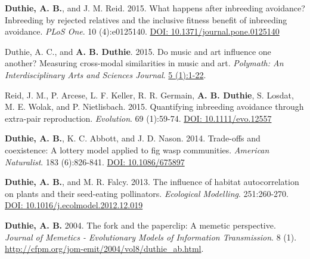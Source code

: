\documentclass[letterpaper]{article}
\begin{document}
\begin{etaremune}
\item {\bf Duthie, A. B.}, and J. M. Reid. 2015. What happens after inbreeding avoidance? Inbreeding by rejected relatives and the inclusive fitness benefit of inbreeding avoidance. {\it PLoS One}. 10 (4):e0125140. \href{http://journals.plos.org/plosone/article?id=10.1371/journal.pone.0125140}{DOI: 10.1371/journal.pone.0125140}
\item Duthie, A. C., and {\bf A. B. Duthie}. 2015. Do music and art influence one another? Measuring cross-modal similarities in music and art. {\it Polymath: An Interdisciplinary Arts and Sciences Journal}. \href{https://ojcs.siue.edu/ojs/index.php/polymath/article/view/3013}{5 (1):1-22}.
\item Reid, J. M., P. Arcese, L. F. Keller, R. R. Germain, {\bf A. B. Duthie}, S. Losdat, M. E. Wolak, and P. Nietlisbach. 2015. Quantifying inbreeding avoidance through extra-pair reproduction. {\it Evolution}. 69 (1):59-74. \href{http://onlinelibrary.wiley.com/doi/10.1111/evo.12557/abstract}{DOI: 10.1111/evo.12557}
\item {\bf Duthie, A. B.}, K. C. Abbott, and J. D. Nason. 2014. Trade-offs and coexistence: A lottery model applied to fig wasp communities. {\it American Naturalist}. 183 (6):826-841. \href{http://www.jstor.org/stable/10.1086/675897}{DOI: 10.1086/675897}
\item {\bf Duthie, A. B.}, and M. R. Falcy. 2013. The influence of habitat autocorrelation on plants and their seed-eating pollinators. {\it Ecological Modelling}. 251:260-270. \href{http://www.sciencedirect.com/science/article/pii/S0304380013000021}{DOI: 10.1016/j.ecolmodel.2012.12.019}
\item {\bf Duthie, A. B.} 2004. The fork and the paperclip: A memetic perspective. {\it Journal of Memetics - Evolutionary Models of Information Transmission}. 8 (1). \href{http://cfpm.org/jom-emit/2004/vol8/duthie_ab.html}{http://cfpm.org/jom-emit/2004/vol8/duthie\_ab.html}.
\end{etaremune}
\end{document}

